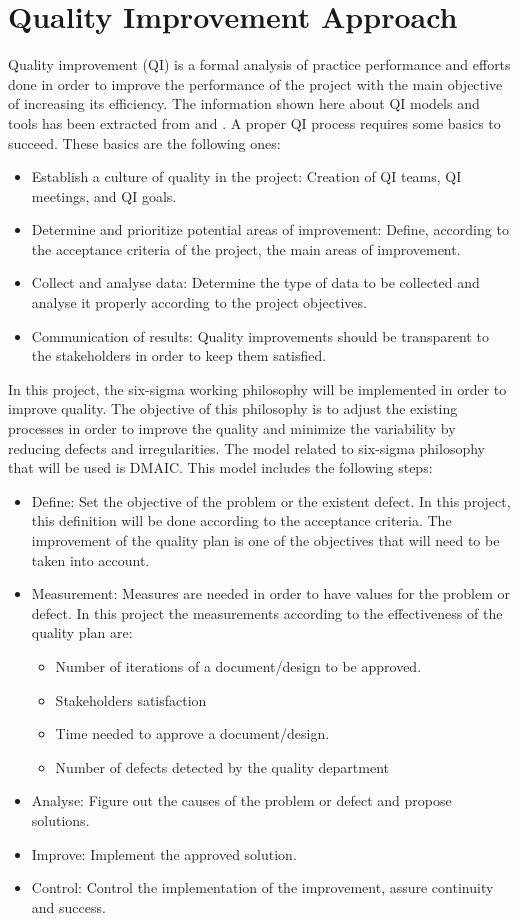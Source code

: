 \section{Quality Improvement Approach}
Quality improvement (QI) is a formal analysis of practice performance and efforts done in order to improve the performance of the project with the main objective of increasing its efficiency. The information shown here about QI models and tools has been extracted from \cite{aafp} and \cite{leansolutions}. A proper QI process requires some basics to succeed. These basics are the following ones:
\begin{itemize}
\item Establish a culture of quality in the project: Creation of QI teams, QI meetings, and QI goals.
\item Determine and prioritize potential areas of improvement: Define, according to the acceptance criteria of the project, the main areas of improvement.
\item Collect and analyse data: Determine the type of data to be collected and analyse it properly according to the project objectives.
\item Communication of results: Quality improvements should be transparent to the stakeholders in order to keep them satisfied. 
\end{itemize}
In this project, the six-sigma working philosophy will be implemented in order to improve quality. The objective of this philosophy is to adjust the existing processes in order to improve the quality and minimize the variability by reducing defects and irregularities. The model related to six-sigma philosophy that will be used is DMAIC. This model includes the following steps:
\begin{itemize}
\item Define: Set the objective of the problem or the existent defect. In this project, this definition will be done according to the acceptance criteria. The improvement of the quality plan is one of the objectives that will need to be taken into account.
\item Measurement: Measures are needed in order to have values for the problem or defect. In this project the measurements according to the effectiveness of the quality plan are:
\begin{itemize}
\item Number of iterations of a document/design to be approved.
\item Stakeholders satisfaction
\item Time needed to approve a document/design.
\item Number of defects detected by the quality department 
\end{itemize}
\item Analyse: Figure out the causes of the problem or defect and propose solutions.
\item Improve: Implement the approved solution.
\item Control: Control the implementation of the improvement, assure continuity and success.
\end{itemize}